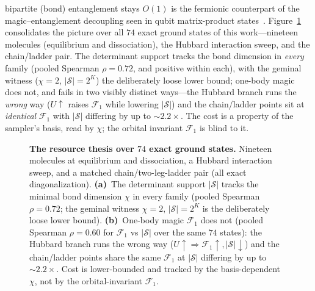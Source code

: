 bipartite (bond) entanglement stays $O(1)$ is the fermionic counterpart of the magic--entanglement
decoupling seen in qubit matrix-product states~\cite{frautarabunga2024}.
Figure~\ref{fig:master} consolidates the picture over all $74$ exact ground states of this
work---nineteen molecules (equilibrium and dissociation), the Hubbard interaction sweep, and the
chain/ladder pair. The determinant support tracks the bond dimension in \emph{every} family (pooled
Spearman $\rho=0.72$, and positive within each), with the geminal witness ($\chi=2$, $|\mathcal S|=2^{K}$)
the deliberately loose lower bound; one-body magic does not, and fails in two visibly distinct ways---the
Hubbard branch runs the \emph{wrong} way ($U\!\uparrow$ raises $\mathcal F_1$ while lowering
$|\mathcal S|$) and the chain/ladder points sit at \emph{identical} $\mathcal F_1$ with $|\mathcal S|$
differing by up to $\sim\!2.2\times$. The cost is a property of the sampler's basis, read by $\chi$; the orbital
invariant $\mathcal F_1$ is blind to it.

\begin{figure}[htbp]\centering
\caption{\textbf{The resource thesis over $74$ exact ground states.} Nineteen molecules at equilibrium and
dissociation, a Hubbard interaction sweep, and a matched chain/two-leg-ladder pair (all exact
diagonalization). \textbf{(a)}~The determinant support $|\mathcal S|$ tracks the minimal bond dimension
$\chi$ in every family (pooled Spearman $\rho=0.72$; the geminal witness $\chi{=}2,\,|\mathcal S|{=}2^{K}$
is the deliberately loose lower bound). \textbf{(b)}~One-body magic $\mathcal F_1$ does not (pooled
Spearman $\rho=0.60$ for $\mathcal F_1$ vs $|\mathcal S|$ over the same $74$ states): the Hubbard
branch runs the wrong way ($U\!\uparrow\Rightarrow\mathcal F_1\!\uparrow,|\mathcal S|\!\downarrow$) and the
chain/ladder points share the same $\mathcal F_1$ at $|\mathcal S|$ differing by up to $\sim\!2.2\times$. Cost is lower-bounded and tracked by
the basis-dependent $\chi$, not by the orbital-invariant $\mathcal F_1$.}\label{fig:master}\end{figure}

